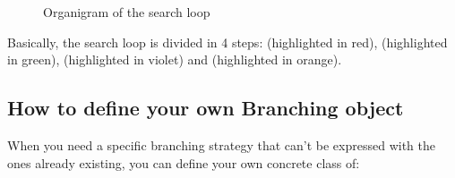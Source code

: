 
\begin{figure}[!htp]
	\centerline{}
	\caption[]{Organigram of the search loop}\label{fig:media/searchloop.pdf}
\end{figure}

Basically, the search loop is divided in 4 steps:  (highlighted in red),  (highlighted in green),  (highlighted in violet) and  (highlighted in orange). 

\subsection{How to define your own Branching object}\label{advanced:beyondvariable/valueselection,howtodefineyourownbranchingobject}\hypertarget{advanced:beyondvariable/valueselection,howtodefineyourownbranchingobject}{}

When you need a specific branching strategy that can't be expressed with the ones already existing, you can define your own concrete class of:




